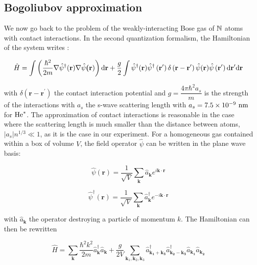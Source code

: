 \subsection{Bogoliubov approximation}

\label{sec:bogo_approx}


We now go back to the problem of the weakly-interacting Bose gas of $\mathbb{N}$ atoms with contact interactions. In the second quantization formalism, the Hamiltonian of the system writes \cite{bogoliubov1947}:


\begin{equation}
    \hat{H}=\int\left(\frac{\hbar^{2}}{2 m} \nabla \hat{\psi}^{\dagger}(\textbf{r}) \nabla \hat{\psi}\textbf{(r})\right) {\rm d} \textbf{r}+\frac{g}{2} \int \hat{\psi}^{\dagger}(\textbf{r}) \hat{\psi}^{\dagger}\left(\textbf{r}^{\prime}\right) \delta\left(\textbf{r}-\textbf{r}^{\prime}\right) \hat{\psi}(\textbf{r}) \hat{\psi}\left(\textbf{r}^{\prime}\right) {\rm d} \textbf{r}^{\prime} {\rm d} \textbf{r}
    \label{eq:bogo_general}
\end{equation}

\noindent with $\delta\left(\textbf{r}-\textbf{r}^{\prime}\right)$ the contact interaction potential and $g=\dfrac{4 \pi \hbar^2 a_s}{m}$ is the strength of the interactions with $a_s$ the s-wave scattering length \cite{landau2013quantum} with $a_s = 7.5 \times 10^{-9} \ \rm{nm}$ for $\mathrm{He}^*$. The approximation of contact interactions is reasonable in the case where the scattering length is much smaller than the distance between atoms, $|a_s| n^{1/3} \ll 1$, as it is the case in our experiment. For a homogeneous gas contained within a box of volume $V$, the field operator $\hat{\psi}$ can be written in the plane wave basis:

\begin{equation}
    \hat{\psi}(\bm{r})=\frac{1}{\sqrt{V}} \sum_{\bm{k}} \hat{a}_{\bm{k}} e^{i \bm{k} \cdot \bm{r}}
\end{equation}

\begin{equation}
    \hat{\psi}^{\dagger}(\bm{r})=\frac{1}{\sqrt{V}} \sum_{\bm{k}} \hat{a}^{\dagger}_{\bm{k}} e^{-i \bm{k} \cdot \bm{r}}
\end{equation}

\noindent with $\hat{a}_{\bm{k}}$ the operator destroying a particle of momentum $k$. The Hamiltonian can then be rewritten

\begin{equation}
    \hat{H}=\sum_{\bm{k}}\frac{\hbar^2 k^2}{2m} \hat{a}^{\dagger}_{\bm{k}}  \hat{a}_{\bm{k}} +  \frac{g}{2V} \sum_{\bm{k}_1,\bm{k}_2,\bm{k}_3} \hat{a}^{\dagger}_{\bm{k_1}+\bm{k_3}} \hat{a}^{\dagger}_{\bm{k_2}-\bm{k_3}} \hat{a}_{\bm{k_1}} \hat{a}_{\bm{k_2}} 
\end{equation}

